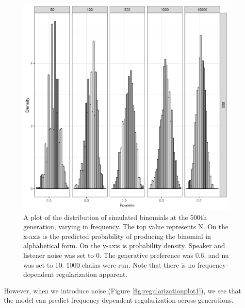 \documentclass[10pt, letterpaper]{article}
\newenvironment{CodeChunk}{}{}
\begin{document}
\begin{CodeChunk}
\begin{figure}[tb]

{\centering \includegraphics[width=1\linewidth]{Figures/noNoise} 

}

\caption[A plot of the distribution of simulated binomials at the 500th generation, varying in frequency]{A plot of the distribution of simulated binomials at the 500th generation, varying in frequency. The top value represents N. On the x-axis is the predicted probability of producing the binomial in alphabetical form. On the y-axis is probability density. Speaker and listener noise was set to 0. The generative preference was 0.6, and nu was set to 10. 1000 chains were run. Note that there is no frequency-dependent regularization apparent.}\label{fig:noNoisePlot}
\end{figure}
\end{CodeChunk}

However, when we introduce noise (Figure \ref{fig:regularizationplot1}),
we see that the model can predict frequency-dependent regularization
across generations.
\end{document}

